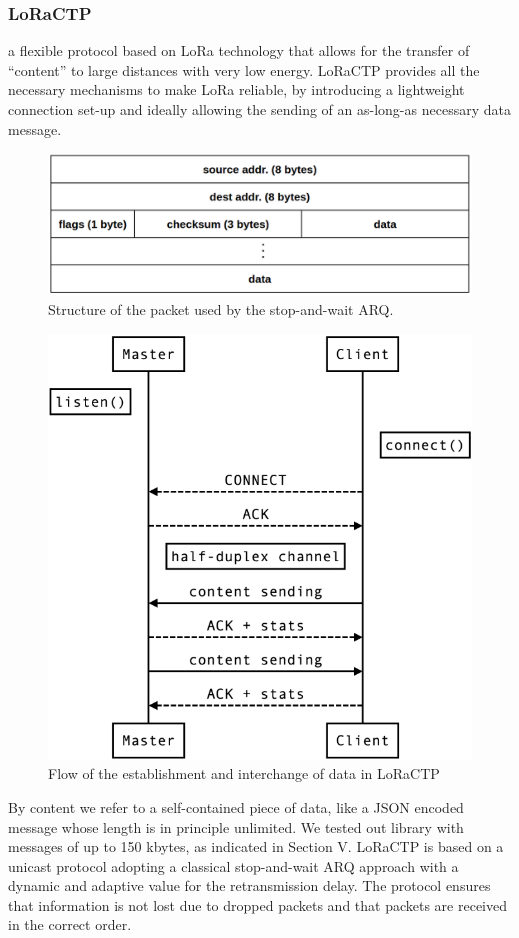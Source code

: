 			\subsubsection{LoRaCTP}
			
				a ﬂexible protocol based
				on LoRa technology that allows for the transfer of “content” to
				large distances with very low energy. LoRaCTP provides all the
				necessary mechanisms to make LoRa reliable, by introducing a
				lightweight connection set-up and ideally allowing the sending
				of an as-long-as necessary data message.
			
				\begin{figure}[H]
					\centering
					\includegraphics[width=.75\textwidth]{resources/img/chap4/loractp_packet}
					\caption[Flow of the establishment and interchange of data in LoRaCTP]{Structure of the packet used by the stop-and-wait ARQ. \cite{loractp}}
				\end{figure}
			
				\begin{figure}[H]
					\centering
					\includegraphics[width=.5\textwidth]{resources/img/chap4/loractp_flow}
					\caption[Flow of the establishment and interchange of data in LoRaCTP]{Flow of the establishment and interchange of data in LoRaCTP \cite{loractp}}
				\end{figure}
		
		By content we refer to a self-contained piece of data, like a
		JSON encoded message whose length is in principle unlimited.
		We tested out library with messages of up to 150 kbytes,
		as indicated in Section V. LoRaCTP is based on a unicast
		protocol adopting a classical stop-and-wait ARQ approach
		with a dynamic and adaptive value for the retransmission
		delay. The protocol ensures that information is not lost due to
		dropped packets and that packets are received in the correct
		order.
		

